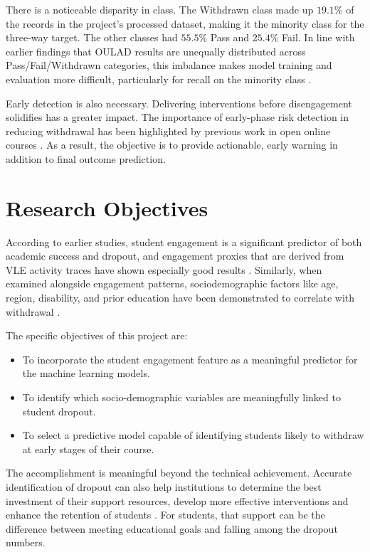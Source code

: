 \documentclass[ %
                    author={Carlos Duran Calle},
                supervisor={Dr. Felipe Campelo},
                    degree={MSc},
                     title={Comparative Machine Learning Analysis for Student Dropout Prediction in a Virtual Learning Environment},
                  subtitle={Incorporating Student Engagement and Socio-Economic Features},
                      type={},
                      year={2025}]{dissertation}
\begin{document}
There is a noticeable disparity in class.  The Withdrawn class made up $19.1\%$ of the records in the project's processed dataset, making it the minority class for the three-way target. The other classes had $55.5\%$ Pass and $25.4\%$ Fail.  In line with earlier findings that OULAD results are unequally distributed across Pass/Fail/Withdrawn categories, this imbalance makes model training and evaluation more difficult, particularly for recall on the minority class \cite{le_quy_survey_2022}.

Early detection is also necessary.  Delivering interventions before disengagement solidifies has a greater impact.  The importance of early-phase risk detection in reducing withdrawal has been highlighted by previous work in open online courses \cite{martinez-carrascal_using_2023}.  As a result, the objective is to provide actionable, early warning in addition to final outcome prediction.

\section{Research Objectives}
According to earlier studies, student engagement is a significant predictor of both academic success and dropout, and engagement proxies that are derived from VLE activity traces have shown especially good results \cite{hussain_student_engagement_prediction_2018}.  Similarly, when examined alongside engagement patterns, sociodemographic factors like age, region, disability, and prior education have been demonstrated to correlate with withdrawal \cite{kuzilek_OULAD_2017}.

The specific objectives of this project are:
\begin{itemize}
	\item To incorporate the student engagement feature as a meaningful predictor for the machine learning models.
	\item To identify which socio-demographic variables are meaningfully linked to student dropout.
	\item To select a predictive model capable of identifying students likely to withdraw at early stages of their course.
\end{itemize}

The accomplishment is meaningful beyond the technical achievement. Accurate identification of dropout can also help institutions to determine the best investment of their support resources, develop more effective interventions and enhance the retention of students \cite{kahu_student_engagement_2013}. For students, that support can be the difference between meeting educational goals and falling among the dropout numbers.
\end{document}
